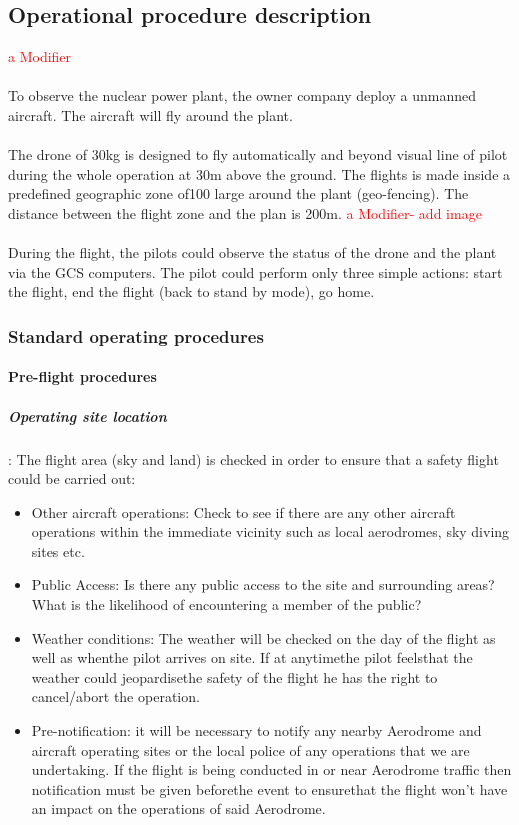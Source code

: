 \documentclass[]{article}
\begin{document}
	\subsection{Operational procedure description} \textcolor{red}{a Modifier}
	\paragraph{}To observe the nuclear power plant, the owner company deploy a unmanned aircraft. The aircraft will fly around the plant. 
	
	\paragraph{} The drone of 30kg is designed to fly automatically and  beyond visual line of pilot during the whole operation at 30m above the ground. The flights is made inside a predefined geographic zone of100 large around the plant (geo-fencing). The distance between the flight zone and the plan is 200m. \textcolor{red}{a Modifier- add image}
	
	\paragraph{}During the flight, the pilots could observe the status of the drone and the plant via the GCS computers. The pilot could perform only three simple actions: start the flight, end the flight (back to stand by mode), go home. 
	
	\subsubsection{Standard operating procedures}
	\paragraph{Pre-flight procedures}
	\subparagraph{Operating site location} : The flight area (sky and land) is checked in order to ensure that a safety flight could be carried out:
	\begin{itemize}
		\item Other aircraft operations: Check to see if there are any other aircraft 
		operations within the immediate vicinity such as local aerodromes, sky 
		diving sites etc.
		\item Public Access: Is there any public access to the site and surrounding 
		areas? What is the likelihood of encountering a member of the public?
		\item Weather conditions: The weather will be checked on the day of the flight as well as whenthe pilot arrives on site. If at anytimethe pilot feelsthat the weather could jeopardisethe safety of the flight he has the right to cancel/abort the operation. 
		\item Pre-notification: it will be necessary to notify any nearby Aerodrome and aircraft operating sites or the local police of any operations that we are undertaking. If the	flight is being conducted in or near Aerodrome traffic then notification must be given beforethe event to ensurethat the flight won’t have an impact on the operations of said Aerodrome.
	\end{itemize} 
	
\end{document}

